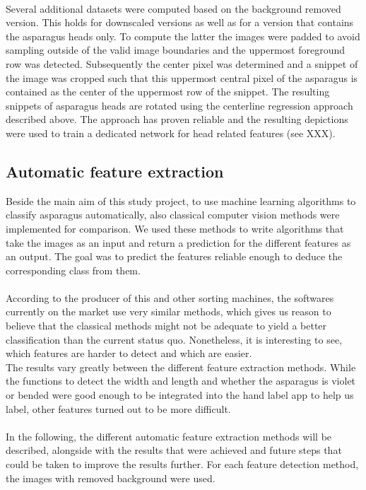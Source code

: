 \\
Several additional datasets were computed based on the background removed version. This holds for downscaled versions as well as for a version that contains the asparagus heads only. To compute the latter the images were padded to avoid sampling outside of the valid image boundaries and the uppermost foreground row was detected. Subsequently the center pixel was determined and a snippet of the image was cropped such that this uppermost central pixel of the asparagus is contained as the center of the uppermost row of the snippet. The resulting snippets of asparagus heads are rotated using the centerline regression approach described above. The approach has proven reliable and the resulting depictions were used to train a dedicated network for head related features (see XXX).


\subsection{Automatic feature extraction}

Beside the main aim of this study project, to use machine learning algorithms to classify asparagus automatically, also classical computer vision methods were implemented for comparison. We used these methods to write algorithms that take the images as an input and return a prediction for the different features as an output. The goal was to predict the features reliable enough to deduce the corresponding class from them. \\
\\
According to the producer of this and other sorting machines, the softwares currently on the market use very similar methods, which gives us reason to believe that the classical methods might not be adequate to yield a better classification than the current status quo. Nonetheless, it is interesting to see, which features are harder to detect and which are easier. \\
The results vary greatly between the different feature extraction methods. While the functions to detect the width and length and whether the asparagus is violet or bended were good enough to be integrated into the hand label app to help us label, other features turned out to be more difficult. \\
\\
In the following, the different automatic feature extraction methods will be described, alongside with the results that were achieved and future steps that could be taken to improve the results further. For each feature detection method, the images with removed background were used.



